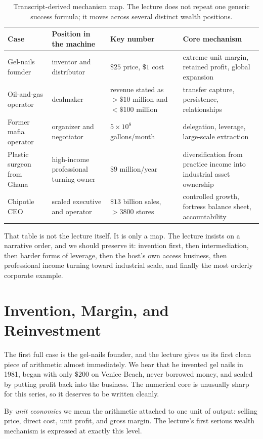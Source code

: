 \begin{table}
\centering
\begin{tabular}{p{3.1cm}p{3.2cm}p{2.6cm}p{4.5cm}}
\hline
Case & Position in the machine & Key number & Core mechanism \\
\hline
Gel-nails founder & inventor and distributor & \(\$25\) price, \(\$1\) cost & extreme unit margin, retained profit, global expansion \\
Oil-and-gas operator & dealmaker & revenue stated as \(>\$10\) million and \(<\$100\) million & transfer capture, persistence, relationships \\
Former mafia operator & organizer and negotiator & \(5\times 10^8\) gallons/month & delegation, leverage, large-scale extraction \\
Plastic surgeon from Ghana & high-income professional turning owner & \(\$9\) million/year & diversification from practice income into industrial asset ownership \\
Chipotle CEO & scaled executive and operator & \(\$13\) billion sales, \(>3800\) stores & controlled growth, fortress balance sheet, accountability \\
\hline
\end{tabular}
\caption{Transcript-derived mechanism map. The lecture does not repeat one generic success formula; it moves across several distinct wealth positions.}
\end{table}

That table is not the lecture itself. It is only a map. The lecture insists on a narrative order, and we should preserve it: invention first, then intermediation, then harder forms of leverage, then the host's own access business, then professional income turning toward industrial scale, and finally the most orderly corporate example.

\section{Invention, Margin, and Reinvestment}

The first full case is the gel-nails founder, and the lecture gives us its first clean piece of arithmetic almost immediately. We hear that he invented gel nails in 1981, began with only \(\$200\) on Venice Beach, never borrowed money, and scaled by putting profit back into the business. The numerical core is unusually sharp for this series, so it deserves to be written cleanly.

\begin{definition}
By \emph{unit economics} we mean the arithmetic attached to one unit of output: selling price, direct cost, unit profit, and gross margin. The lecture's first serious wealth mechanism is expressed at exactly this level.
\end{definition}

